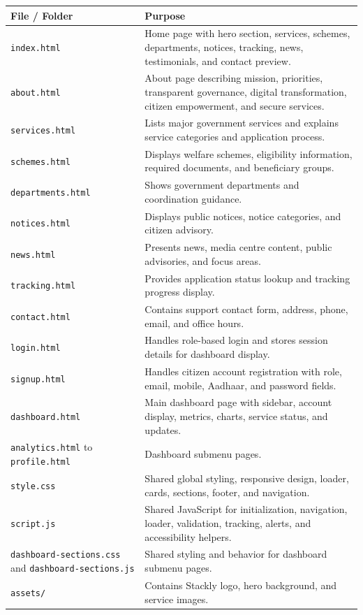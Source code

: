 \documentclass[12pt,a4paper]{report}
\begin{document}
\begin{longtable}{|p{2.0in}|p{3.6in}|}
\hline
\textbf{File / Folder} & \textbf{Purpose} \\
\hline
\texttt{index.html} & Home page with hero section, services, schemes, departments, notices, tracking, news, testimonials, and contact preview. \\
\hline
\texttt{about.html} & About page describing mission, priorities, transparent governance, digital transformation, citizen empowerment, and secure services. \\
\hline
\texttt{services.html} & Lists major government services and explains service categories and application process. \\
\hline
\texttt{schemes.html} & Displays welfare schemes, eligibility information, required documents, and beneficiary groups. \\
\hline
\texttt{departments.html} & Shows government departments and coordination guidance. \\
\hline
\texttt{notices.html} & Displays public notices, notice categories, and citizen advisory. \\
\hline
\texttt{news.html} & Presents news, media centre content, public advisories, and focus areas. \\
\hline
\texttt{tracking.html} & Provides application status lookup and tracking progress display. \\
\hline
\texttt{contact.html} & Contains support contact form, address, phone, email, and office hours. \\
\hline
\texttt{login.html} & Handles role-based login and stores session details for dashboard display. \\
\hline
\texttt{signup.html} & Handles citizen account registration with role, email, mobile, Aadhaar, and password fields. \\
\hline
\texttt{dashboard.html} & Main dashboard page with sidebar, account display, metrics, charts, service status, and updates. \\
\hline
\texttt{analytics.html} to \texttt{profile.html} & Dashboard submenu pages. \\
\hline
\texttt{style.css} & Shared global styling, responsive design, loader, cards, sections, footer, and navigation. \\
\hline
\texttt{script.js} & Shared JavaScript for initialization, navigation, loader, validation, tracking, alerts, and accessibility helpers. \\
\hline
\texttt{dashboard-sections.css} and \texttt{dashboard-sections.js} & Shared styling and behavior for dashboard submenu pages. \\
\hline
\texttt{assets/} & Contains Stackly logo, hero background, and service images. \\
\hline
\end{longtable}
\end{document}
